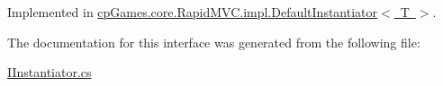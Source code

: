 Implemented in \mbox{\hyperlink{classcp_games_1_1core_1_1_rapid_m_v_c_1_1impl_1_1_default_instantiator_ab2c79e24d96f9e860666b5aee6e07548}{cp\+Games.\+core.\+Rapid\+M\+V\+C.\+impl.\+Default\+Instantiator$<$ T $>$}}.



The documentation for this interface was generated from the following file\+:\begin{DoxyCompactItemize}
\item 
\mbox{\hyperlink{_i_instantiator_8cs}{I\+Instantiator.\+cs}}\end{DoxyCompactItemize}
